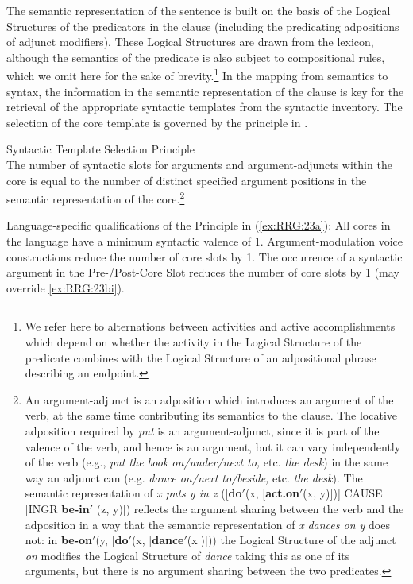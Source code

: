 \documentclass[output=paper,hidelinks]{langscibook}
\begin{document}
  The semantic representation of the sentence is built on the basis of the Logical Structures of the predicators in the clause (including the predicating adpositions of adjunct modifiers). These Logical Structures are drawn from the lexicon, although the semantics of the predicate is also subject to compositional rules, which we omit here for the sake of brevity.\footnote{We refer here to alternations between activities and active accomplishments which depend on whether the activity in the Logical Structure of the predicate combines with the Logical Structure of an adpositional phrase describing an endpoint.} In the mapping from semantics to syntax, the information in the semantic representation of the clause is key for the retrieval of the appropriate syntactic templates from the syntactic inventory. The selection of the core template is governed by the principle in .

\ea%
\label{ex:RRG:23}
\ea\label{ex:RRG:23a} Syntactic Template Selection Principle\\
The number of syntactic slots for arguments and argument-adjuncts within the core is equal to the number of distinct specified argument positions in the semantic representation of the core.\footnote{An argument-adjunct is an adposition which introduces an argument of the verb, at the same time contributing its semantics to the clause. The locative adposition required by \textit{put} is an argument-adjunct, since it is part of the valence of the verb, and hence is an argument, but it can vary independently of the verb (e.g., \textit{put the book on/under/next to,} etc. \textit{the desk}) in the same way an adjunct can (e.g. \textit{dance on/next to/beside,} etc. \textit{the desk}). The semantic representation of \textit{x puts y in z} ([\textbf{do$'$}(x, [\textbf{act.on$'$}(x, y)])] CAUSE [INGR \textbf{be-in$'$} (z, y)]) reflects the argument sharing between the verb and the adposition in a way that the semantic representation of \textit{x} \textit{dances on y} does not: in \textbf{be-on$'$}(y, [\textbf{do$'$}(x, [\textbf{dance$'$}(x])])) the Logical Structure of the adjunct \textit{on} modifies the Logical Structure of \textit{dance} taking this as one of its arguments, but there is no argument sharing between the two predicates.}

\newpage
\ex\label{ex:RRG:23b} Language-specific qualifications of the Principle in (\ref{ex:RRG:23a}):
\ea\label{ex:RRG:23bi} All cores in the language have a minimum syntactic valence of 1.
\ex\label{ex:RRG:23bii} Argument-modulation voice constructions reduce the number of core slots by 1.
\ex\label{ex:RRG:23biii} The occurrence of a syntactic argument in the Pre-/Post-Core Slot reduces the number of core slots by 1 (may override \ref{ex:RRG:23bi}).
\z\z\z
\end{document}
